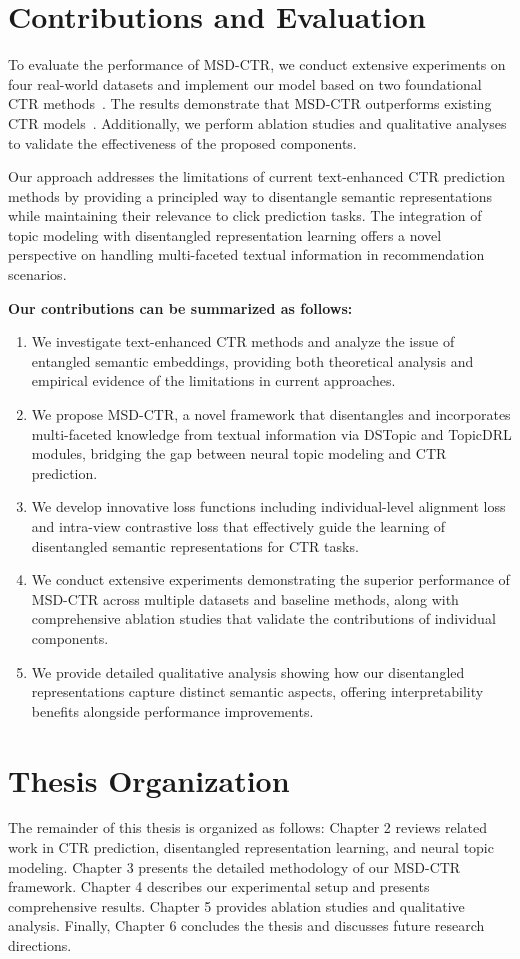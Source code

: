 \section{Contributions and Evaluation}

To evaluate the performance of MSD-CTR, we conduct extensive experiments on four real-world datasets and implement our model based on two foundational CTR methods~\cite{guo2017deepfm, wang2021dcn}. The results demonstrate that MSD-CTR outperforms existing CTR models~\cite{zhou2019deep, feng2019deep}. Additionally, we perform ablation studies and qualitative analyses to validate the effectiveness of the proposed components.

Our approach addresses the limitations of current text-enhanced CTR prediction methods by providing a principled way to disentangle semantic representations while maintaining their relevance to click prediction tasks. The integration of topic modeling with disentangled representation learning offers a novel perspective on handling multi-faceted textual information in recommendation scenarios.

\textbf{Our contributions can be summarized as follows:}
\begin{enumerate}
    \item We investigate text-enhanced CTR methods and analyze the issue of entangled semantic embeddings, providing both theoretical analysis and empirical evidence of the limitations in current approaches.
    \item We propose MSD-CTR, a novel framework that disentangles and incorporates multi-faceted knowledge from textual information via DSTopic and TopicDRL modules, bridging the gap between neural topic modeling and CTR prediction.
    \item We develop innovative loss functions including individual-level alignment loss and intra-view contrastive loss that effectively guide the learning of disentangled semantic representations for CTR tasks.
    \item We conduct extensive experiments demonstrating the superior performance of MSD-CTR across multiple datasets and baseline methods, along with comprehensive ablation studies that validate the contributions of individual components.
    \item We provide detailed qualitative analysis showing how our disentangled representations capture distinct semantic aspects, offering interpretability benefits alongside performance improvements.
\end{enumerate}

\section{Thesis Organization}

The remainder of this thesis is organized as follows: Chapter 2 reviews related work in CTR prediction, disentangled representation learning, and neural topic modeling. Chapter 3 presents the detailed methodology of our MSD-CTR framework. Chapter 4 describes our experimental setup and presents comprehensive results. Chapter 5 provides ablation studies and qualitative analysis. Finally, Chapter 6 concludes the thesis and discusses future research directions.
